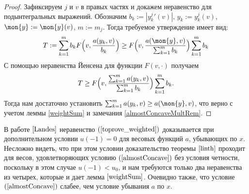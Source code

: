 \begin{proof}
Зафиксируем $j$ и $v$ в правых частях и докажем неравенство для подынтегральных выражений.
Обозначим $b_k := |y_k^j{}'(v)|$, $y_k := y_k^j(v)$, $\mon{y} := \mon{y}(v)$, $m := m_j$. Тогда
требуемое утверждение имеет вид:
$$T:=\sum_{k=1}^m b_k F \Bigl( v, \frac{ a(y_k, v) }{b_k} \Bigr) \ge F \Bigl( v, \frac{ a(\mon{y}, v) }{ \sum_{k=1}^m b_k  } \Bigr) \sum_{k=1}^m b_k$$
С помощью неравенства Йенсена для функции $F(v, \cdot)$ получаем
$$T \ge F \Bigl( v, \frac{ \sum_{k=1}^m a(y_k, v) }{ \sum_{k=1}^m b_k } \Bigr) \sum_{k=1}^m b_k.$$
Тогда нам достаточно установить $\sum_{k=1}^m a(y_k, v) \ge a(\mon{y}, v)$, что верно с учетом леммы \ref{weightSum} и замечания
\ref{almostConcaveMultRem}.
\end{proof}

\begin{rem}
\label{landesLinear}
В работе $\cite{Landes}$ неравенство $(\ref{toprove_weighted})$ доказывается при дополнительном условии $u(-1) = 0$
для весовых функций $a$, убывающих по $x$.
Несложно видеть, что при этом условии доказательство теоремы $\ref{linth}$ проходит для весов, удовлетворяющих условию
$(\ref{almostConcave})$ без условия четности,
поскольку в этом случае $u(-1) < u_0$, и нам требуются только два неравенства из четырех,
которые и дает лемма $\ref{weightSum}$.
Очевидно также, что условие $(\ref{almostConcave})$ слабее, чем условие убывания $a$ по $x$.
\end{rem}

